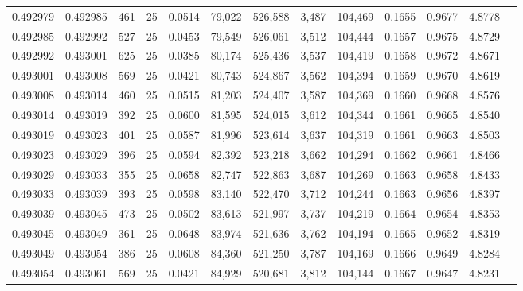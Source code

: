 \begin{tabular}{rrrrrrrrrrrrr}
0.492979 & 0.492985 &   461 &  25 &                                     0.0514 &  79,022 & 526,588 &   3,487 & 104,469 & 0.1655 & 0.9677 & 4.8778 \\
0.492985 & 0.492992 &   527 &  25 &                                     0.0453 &  79,549 & 526,061 &   3,512 & 104,444 & 0.1657 & 0.9675 & 4.8729 \\
0.492992 & 0.493001 &   625 &  25 &                                     0.0385 &  80,174 & 525,436 &   3,537 & 104,419 & 0.1658 & 0.9672 & 4.8671 \\
0.493001 & 0.493008 &   569 &  25 &                                     0.0421 &  80,743 & 524,867 &   3,562 & 104,394 & 0.1659 & 0.9670 & 4.8619 \\
0.493008 & 0.493014 &   460 &  25 &                                     0.0515 &  81,203 & 524,407 &   3,587 & 104,369 & 0.1660 & 0.9668 & 4.8576 \\
0.493014 & 0.493019 &   392 &  25 &                                     0.0600 &  81,595 & 524,015 &   3,612 & 104,344 & 0.1661 & 0.9665 & 4.8540 \\
0.493019 & 0.493023 &   401 &  25 &                                     0.0587 &  81,996 & 523,614 &   3,637 & 104,319 & 0.1661 & 0.9663 & 4.8503 \\
0.493023 & 0.493029 &   396 &  25 &                                     0.0594 &  82,392 & 523,218 &   3,662 & 104,294 & 0.1662 & 0.9661 & 4.8466 \\
0.493029 & 0.493033 &   355 &  25 &                                     0.0658 &  82,747 & 522,863 &   3,687 & 104,269 & 0.1663 & 0.9658 & 4.8433 \\
0.493033 & 0.493039 &   393 &  25 &                                     0.0598 &  83,140 & 522,470 &   3,712 & 104,244 & 0.1663 & 0.9656 & 4.8397 \\
0.493039 & 0.493045 &   473 &  25 &                                     0.0502 &  83,613 & 521,997 &   3,737 & 104,219 & 0.1664 & 0.9654 & 4.8353 \\
0.493045 & 0.493049 &   361 &  25 &                                     0.0648 &  83,974 & 521,636 &   3,762 & 104,194 & 0.1665 & 0.9652 & 4.8319 \\
0.493049 & 0.493054 &   386 &  25 &                                     0.0608 &  84,360 & 521,250 &   3,787 & 104,169 & 0.1666 & 0.9649 & 4.8284 \\
0.493054 & 0.493061 &   569 &  25 &                                     0.0421 &  84,929 & 520,681 &   3,812 & 104,144 & 0.1667 & 0.9647 & 4.8231 \\

\end{tabular}
